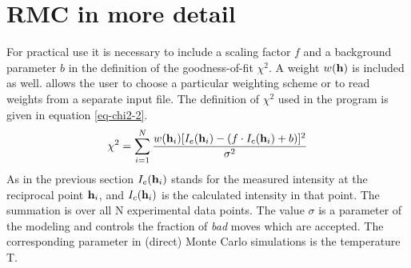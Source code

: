 
\section{RMC in more detail \label{rmc-detail}}

For practical use it is necessary to include a scaling factor $f$
and a background parameter $b$ in the definition of the
goodness-of-fit $\chi^{2}$. A weight $w({\bf h})$ is included as
well. \Discus allows the user to choose a particular weighting
scheme or to read weights from a separate input file. The definition
of $\chi^{2}$ used in the program is given in equation
\ref{eq-chi2-2}.
%
\begin{equation}
    \chi^{2} = \sum_{i=1}^{N} \frac { w({\bf h}_{i}) [ I_{e}({\bf h}_{i}) -
               (f \cdot I_{c}({\bf h}_{i}) + b) ] ^{2}} { \sigma^{2} }
    \label{eq-chi2-2}
\end{equation}
%
As in the previous section $I_{e}({\bf h}_{i})$ stands for the
measured intensity at the reciprocal point ${\bf h}_{i}$, and
$I_{c}({\bf h}_{i})$ is the calculated intensity in that point. The
summation is over all N experimental data points.  The value
$\sigma$ is a parameter of the modeling and controls the fraction of
{\it bad} moves which are accepted. The corresponding parameter in
(direct) Monte Carlo simulations is the temperature T.\par

